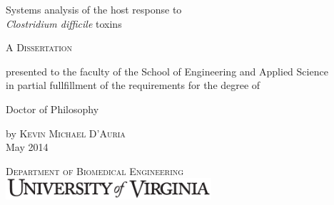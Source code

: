 \begin{titlepage}
\begin{caslonpro}


\center 

\vspace{1in}

{ \Huge Systems analysis of the host response to \\[0.1in]
      \emph{Clostridium difficile} toxins }\\[0.4cm] 
               
\vspace{0.9in}
       

\textsc{\LARGE A Dissertation}\\[0.3in] %

\vspace{0.6in}

presented to the faculty of the School
of Engineering and Applied Science \\
in partial fullfillment of the
requirements for the degree of

\vspace{0.3in} 

\Large Doctor of Philosophy

\vspace{1.3in}

by \textsc{ \huge Kevin Michael D'Auria } \\[0.05in]
\large May 2014

\vspace{1.4in}

\textsc{\Large Department of Biomedical Engineering}\\[0.1in] 
\includegraphics[width=3in]{TitlePage/uvaname.pdf}\\[0.02in]

\end{caslonpro}
\end{titlepage}
\clearpage

